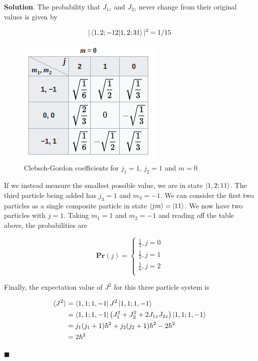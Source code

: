 \documentclass[12pt]{article}
\theoremstyle{definition}
\newenvironment{s}{%
        \begin{trivlist} \item \textbf{Solution}. }{%
            \hspace*{\fill} $\blacksquare$\end{trivlist}}%
\begin{document}
{\begin{s}
The probability that $J_{1z}$ and $J_{2z}$ never change from their original values is given by 

\begin{align*}
|\bra{1,2;-12}\ket{1,2;31}|^{2} = 1/15
\end{align*}

\begin{figure}
\centering
\includegraphics[scale=0.75]{cb-table-2.png}
\caption{Clebsch-Gordon coefficients for $j_{1} = 1$, $j_{2} = 1$ and $m=0$}
\end{figure}

If we instead measure the smallest possible value, we are in state $\ket{1,2;11}$. The third particle being added has $j_{3} = 1$ and $m_{3} = -1$. We can consider the first two particles as a single composite particle in state $\ket{jm} = \ket{11}$. We now have two particles with $j = 1$. Taking $m_{1} = 1$ and $m_{2} = -1$ and reading off the table above, the probabilities are

$$
\mathbf{Pr}(j)=
\begin{cases}
\frac{1}{3}, j = 0 \\
\frac{1}{2}, j = 1 \\
\frac{1}{6}, j = 2 \\
\end{cases}
$$

Finally, the expectation value of $J^{2}$ for this three particle system is 

\begin{align*}
\langle J^{2} \rangle &= \bra{1,1;1,-1}J^{2}\ket{1,1;1,-1}\\
&= \bra{1,1;1,-1}\left(J_{1}^{2}+J_{2}^{2} + 2J_{1z}J_{2z}\right)\ket{1,1;1,-1}\\
&= j_{1}(j_{1}+1)\hbar^{2} + j_{2}(j_{2}+1)\hbar^{2} - 2\hbar^{2}\\
&= 2\hbar^{2}
\end{align*}

\end{s}
\end{document}
